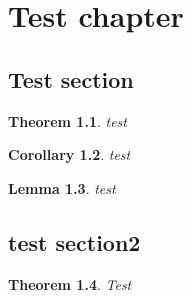\documentclass{book}
\newtheorem{theo}{Theorem}[section]
\newtheorem{lemm}[theo]{Lemma}
\newtheorem{coro}[theo]{Corollary}
\begin{document}
\chapter{Test chapter}
\section{Test section}

\begin{theo}
test
\end{theo}

\begin{coro}
test
\end{coro}

\begin{lemm}
test
\end{lemm}

\section{test section2}

\begin{theo} Test \end{theo}
\end{document}
